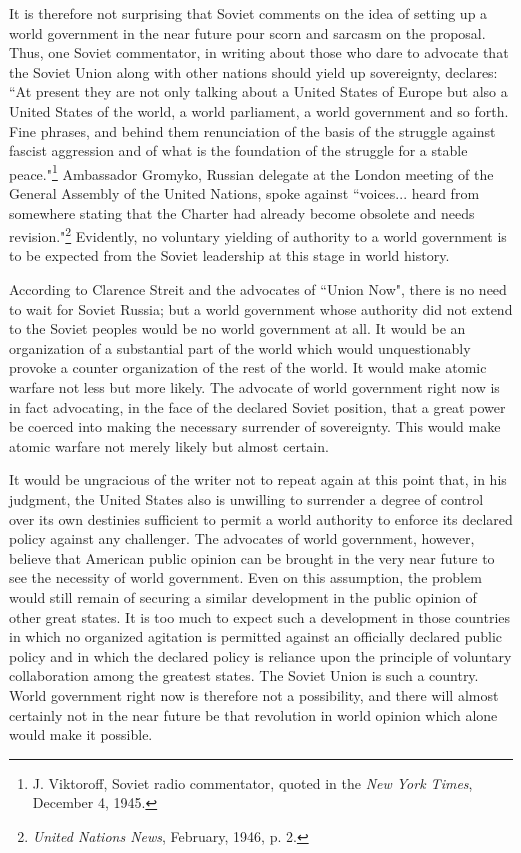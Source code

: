 It is therefore not surprising that Soviet comments on the idea of setting up a world government in the near future pour scorn and sarcasm on the proposal. Thus, one Soviet commentator, in writing about those who dare to advocate that the Soviet Union along with other nations should yield up sovereignty, declares: ``At present they are not only talking about a United States of Europe but also a United States of the world, a world parliament, a world government and so forth. Fine phrases, and behind them renunciation of the basis of the struggle against fascist aggression and of what is the foundation of the struggle for a stable peace."\footnote{J. Viktoroff, Soviet radio commentator, quoted in the \textit{New York Times}, December 4, 1945.} Ambassador Gromyko, Russian delegate at the London meeting of the General Assembly of the United Nations, spoke against ``voices... heard from somewhere stating that the Charter had already become obsolete and needs revision."\footnote{\textit{United Nations News}, February, 1946, p. 2.} Evidently, no voluntary yielding of authority to a world government is to be expected from the Soviet leadership at this stage in world history.

According to Clarence Streit and the advocates of ``Union Now", there is no need to wait for Soviet Russia; but a world government whose authority did not extend to the Soviet peoples would be no world government at all. It would be an organization of a substantial part of the world which would unquestionably provoke a counter organization of the rest of the world. It would make atomic warfare not less but more likely. The advocate of world government right now is in fact advocating, in the face of the declared Soviet position, that a great power be coerced into making the necessary surrender of sovereignty. This would make atomic warfare not merely likely but almost certain.

It would be ungracious of the writer not to repeat again at this point that, in his judgment, the United States also is unwilling to surrender a degree of control over its own destinies sufficient to permit a world authority to enforce its declared policy against any challenger. The advocates of world government, however, believe that American public opinion can be brought in the very near future to see the necessity of world government. Even on this assumption, the problem would still remain of securing a similar development in the public opinion of other great states. It is too much to expect such a development in those countries in which no organized agitation is permitted against an officially declared public policy and in which the declared policy is reliance upon the principle of voluntary collaboration among the greatest states. The Soviet Union is such a country. World government right now is therefore not a possibility, and there will almost certainly not in the near future be that revolution in world opinion which alone would make it possible.

